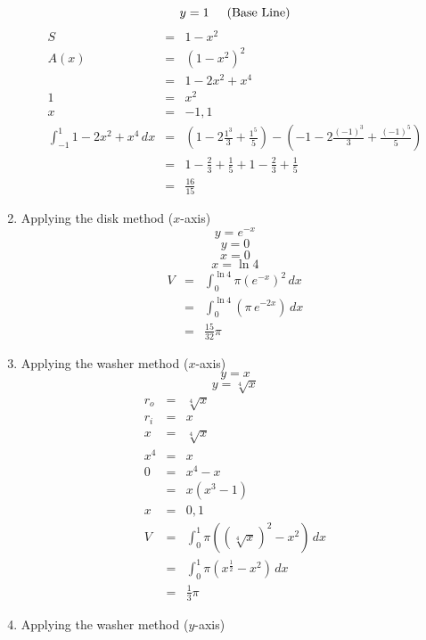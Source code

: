 \documentclass{article}
\begin{document}
\begin{enumerate}
        $$y = 1 \hspace{0.5cm} \text{(Base Line)}$$
        \begin{eqnarray}
            S &=& 1 - x^2 \\
            A(x) &=& \left(1 - x^2\right)^2 \\
                 &=& 1 - 2x^2 + x^4 \\
            1 &=& x^2 \\
            x &=& -1, 1 \\
            \int_{-1}^1{1 - 2x^2 + x^4\,dx} &=& \left(1 - 2\frac{1^3}{3} + \frac{1^5}{5}\right) - \left(-1 - 2\frac{(-1)^3}{3} + \frac{(-1)^5}{5}\right) \\
                                            &=& 1 - \frac{2}{3} + \frac{1}{5} + 1 - \frac{2}{3} + \frac{1}{5} \\
                                            &=& \frac{16}{15}
        \end{eqnarray}
    \item Applying the disk method ($x$-axis)
        $$y = e^{-x}$$
        $$y = 0$$
        $$x = 0$$
        $$x = \ln{4}$$
        \begin{eqnarray}
            V &=& \int_0^{\ln{4}}{\pi\left(e^{-x}\right)^2\,dx} \\
              &=& \int_0^{\ln{4}}{\left(\pi\,e^{-2x}\right)\,dx} \\
              &=& \frac{15}{32}\pi
        \end{eqnarray}
    \item Applying the washer method ($x$-axis)
        $$y = x$$
        $$y = \sqrt[4]{x}$$
        \begin{eqnarray}
            r_o &=& \sqrt[4]{x} \\
            r_i &=& x \\
            x &=& \sqrt[4]{x} \\
            x^4 &=& x \\
            0 &=& x^4 - x \\
              &=& x\left(x^3 - 1\right) \\
            x &=& 0, 1 \\
            V &=& \int_0^1{\pi\left(\left(\sqrt[4]{x}\right)^2 - x^2\right)\,dx} \\
              &=& \int_0^1{\pi\left(x^{\frac{1}{2}} - x^2\right)\,dx} \\
              &=& \frac{1}{3}\pi
        \end{eqnarray}
    \item Applying the washer method ($y$-axis)

\end{enumerate}
\end{document}
